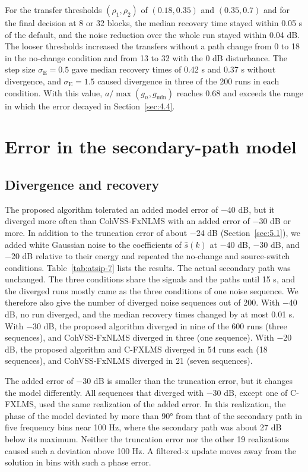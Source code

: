 \documentclass[sip,biber]{now-journal}
\begin{document}
For the transfer thresholds \((\rho_1, \rho_2)\) of \((0.18, 0.35)\) and \((0.35, 0.7)\) and for the final decision at 8 or 32 blocks, the median recovery time stayed within 0.05 s of the default, and the noise reduction over the whole run stayed within 0.04 dB. The looser thresholds increased the transfers without a path change from 0 to 18 in the no-change condition and from 13 to 32 with the 0 dB disturbance. The step size \(\sigma_{\mathrm E} = 0.5\) gave median recovery times of 0.42 s and 0.37 s without divergence, and \(\sigma_{\mathrm E} = 1.5\) caused divergence in three of the 200 runs in each condition. With this value, \(a/\max(g_n, g_{\min})\) reaches 0.68 and exceeds the range in which the error decayed in Section~\ref{sec:4.4}.

\hypertarget{sec:8}{%
\section{Error in the secondary-path model}\label{sec:8}}

\hypertarget{sec:8.1}{%
\subsection{Divergence and recovery}\label{sec:8.1}}



The proposed algorithm tolerated an added model error of −40 dB, but it diverged more often than CohVSS-FxNLMS with an added error of −30 dB or more. In addition to the truncation error of about −24 dB (Section~\ref{sec:5.1}), we added white Gaussian noise to the coefficients of \(\hat{s}(k)\) at −40 dB, −30 dB, and −20 dB relative to their energy and repeated the no-change and source-switch conditions. Table~\ref{tab:atsip-7} lists the results. The actual secondary path was unchanged. The three conditions share the signals and the paths until 15 s, and the diverged runs mostly came as the three conditions of one noise sequence. We therefore also give the number of diverged noise sequences out of 200. With −40 dB, no run diverged, and the median recovery times changed by at most 0.01 s. With −30 dB, the proposed algorithm diverged in nine of the 600 runs (three sequences), and CohVSS-FxNLMS diverged in three (one sequence). With −20 dB, the proposed algorithm and C-FXLMS diverged in 54 runs each (18 sequences), and CohVSS-FxNLMS diverged in 21 (seven sequences).

The added error of −30 dB is smaller than the truncation error, but it changes the model differently. All sequences that diverged with −30 dB, except one of C-FXLMS, used the same realization of the added error. In this realization, the phase of the model deviated by more than 90° from that of the secondary path in five frequency bins near 100 Hz, where the secondary path was about 27 dB below its maximum. Neither the truncation error nor the other 19 realizations caused such a deviation above 100 Hz. A filtered-x update moves away from the solution in bins with such a phase error.
\end{document}
